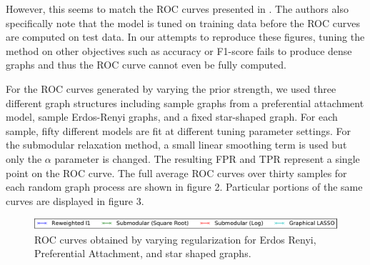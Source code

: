 \documentclass{uwstat572}
\theoremstyle{remark}
\theoremstyle{definition}
\begin{document}
However, this seems to match the ROC curves presented in \cite{Defazio2012}.  The authors also specifically note that the model is tuned on training data before the ROC curves are computed on test data.  In our attempts to reproduce these figures, tuning the method on other objectives such as accuracy or F1-score fails to produce dense graphs and thus the ROC curve cannot even be fully computed.  

For the ROC curves generated by varying the prior strength, we used three different graph structures including sample graphs from a preferential attachment model, sample Erdos-Renyi graphs, and a fixed star-shaped graph. For each sample, fifty different models are fit at different tuning parameter settings. For the submodular relaxation method, a small linear smoothing term is used but only the $\alpha$ parameter is changed.  The resulting FPR and TPR represent a single point on the ROC curve.  The full average ROC curves over thirty samples for each random graph process are shown in figure 2.  Particular portions of the same curves are displayed in figure 3. 

\begin{figure}
\centering
\includegraphics[width=1.0\linewidth]{legend.pdf}

\caption{ROC curves obtained by varying regularization for Erdos Renyi, Preferential Attachment, and star shaped graphs.}
\label{fig:paramfull}
\end{figure}
\end{document}
